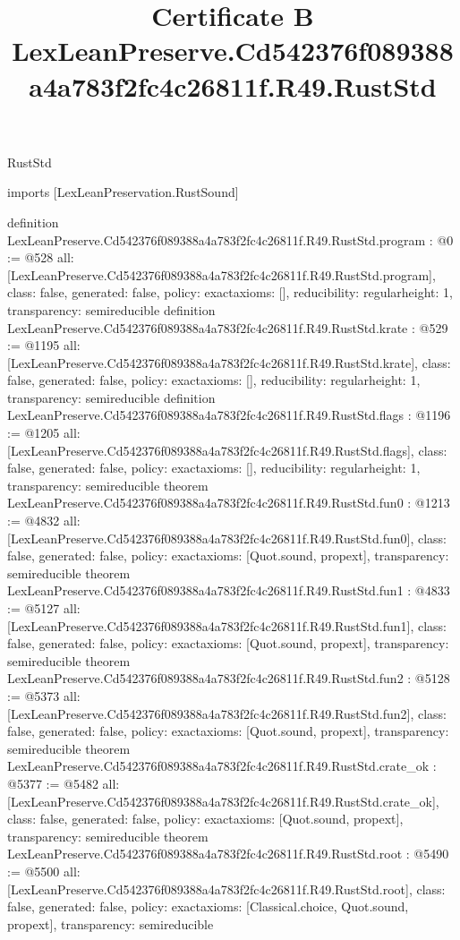 \begin{lexlean}{RustStd}
\title{Certificate B LexLeanPreserve.Cd542376f089388a4a783f2fc4c26811f.R49.RustStd}
\begin{coremodule}
imports [LexLeanPreservation.RustSound]

definition LexLeanPreserve.Cd542376f089388a4a783f2fc4c26811f.R49.RustStd.program : @0 := @528 {
  all: [LexLeanPreserve.Cd542376f089388a4a783f2fc4c26811f.R49.RustStd.program],
  class: false,
  generated: false,
  policy: exact{axioms: []},
  reducibility: regular{height: 1},
  transparency: semireducible
}
definition LexLeanPreserve.Cd542376f089388a4a783f2fc4c26811f.R49.RustStd.krate : @529 := @1195 {
  all: [LexLeanPreserve.Cd542376f089388a4a783f2fc4c26811f.R49.RustStd.krate],
  class: false,
  generated: false,
  policy: exact{axioms: []},
  reducibility: regular{height: 1},
  transparency: semireducible
}
definition LexLeanPreserve.Cd542376f089388a4a783f2fc4c26811f.R49.RustStd.flags : @1196 := @1205 {
  all: [LexLeanPreserve.Cd542376f089388a4a783f2fc4c26811f.R49.RustStd.flags],
  class: false,
  generated: false,
  policy: exact{axioms: []},
  reducibility: regular{height: 1},
  transparency: semireducible
}
theorem LexLeanPreserve.Cd542376f089388a4a783f2fc4c26811f.R49.RustStd.fun0 : @1213 := @4832 {
  all: [LexLeanPreserve.Cd542376f089388a4a783f2fc4c26811f.R49.RustStd.fun0],
  class: false,
  generated: false,
  policy: exact{axioms: [Quot.sound, propext]},
  transparency: semireducible
}
theorem LexLeanPreserve.Cd542376f089388a4a783f2fc4c26811f.R49.RustStd.fun1 : @4833 := @5127 {
  all: [LexLeanPreserve.Cd542376f089388a4a783f2fc4c26811f.R49.RustStd.fun1],
  class: false,
  generated: false,
  policy: exact{axioms: [Quot.sound, propext]},
  transparency: semireducible
}
theorem LexLeanPreserve.Cd542376f089388a4a783f2fc4c26811f.R49.RustStd.fun2 : @5128 := @5373 {
  all: [LexLeanPreserve.Cd542376f089388a4a783f2fc4c26811f.R49.RustStd.fun2],
  class: false,
  generated: false,
  policy: exact{axioms: [Quot.sound, propext]},
  transparency: semireducible
}
theorem LexLeanPreserve.Cd542376f089388a4a783f2fc4c26811f.R49.RustStd.crate_ok : @5377 := @5482 {
  all: [LexLeanPreserve.Cd542376f089388a4a783f2fc4c26811f.R49.RustStd.crate_ok],
  class: false,
  generated: false,
  policy: exact{axioms: [Quot.sound, propext]},
  transparency: semireducible
}
theorem LexLeanPreserve.Cd542376f089388a4a783f2fc4c26811f.R49.RustStd.root : @5490 := @5500 {
  all: [LexLeanPreserve.Cd542376f089388a4a783f2fc4c26811f.R49.RustStd.root],
  class: false,
  generated: false,
  policy: exact{axioms: [Classical.choice, Quot.sound, propext]},
  transparency: semireducible
}


\end{coremodule}
\end{lexlean}
